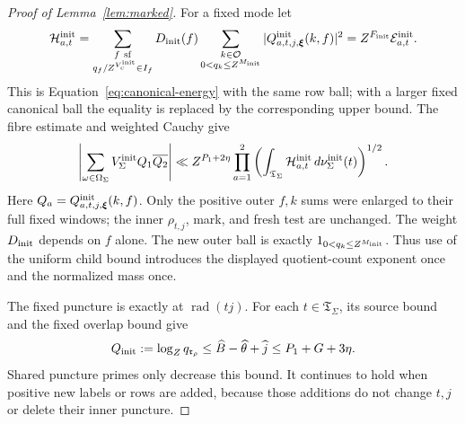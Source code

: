 \documentclass[11pt,a4paper]{article}
\numberwithin{equation}{section}
\numberwithin{figure}{section}
\theoremstyle{definition}
\theoremstyle{remark}
\begin{document}
\begin{proof}[Proof of Lemma~\ref{lem:marked}]
For a fixed mode let
\begin{equation}\label{eq:initial-positive-child}
 \mathcal H_{a,t}^{\rm init}
 =\sum_{\substack{f\ {\rm sf}\\q_f/Z^{V_c^{\rm init}}\in I_f}}
 D_{\rm init}(f)\sum_{\substack{k\in\mathcal O\\0<q_k\le Z^{M_{\rm init}}}}
 |Q^{\rm init}_{a,t,j,\boldsymbol\xi}(k,f)|^2
 =Z^{F_{\rm init}}\mathcal E_{a,t}^{\rm init}.
\end{equation}
This is Equation~\eqref{eq:canonical-energy} with the same row ball;
with a larger fixed canonical ball the equality is replaced by the
corresponding upper bound.  The fibre estimate and weighted Cauchy give
\begin{equation}\label{eq:initial-weighted-count}
 \left|\sum_{\omega\in\Omega_\Sigma}V_\Sigma^{\rm init}Q_1\overline{Q_2}\right|
 \ll Z^{P_1+2\eta}
 \prod_{a=1}^2
 \left(\int_{\mathfrak T_\Sigma}\mathcal H_{a,t}^{\rm init}
                         \,d\nu_\Sigma^{\rm init}(t)\right)^{1/2}.
\end{equation}
Here \(Q_a=Q^{\rm init}_{a,t,j,\boldsymbol\xi}(k,f)\).
Only the positive outer \(f,k\) sums were enlarged to their full
fixed windows; the inner \(\rho_{t,j}\), mark, and fresh test are
unchanged.  The weight \(D_{\rm init}\) depends on \(f\) alone.
The new outer ball is exactly \(1_{0<q_k\le Z^{M_{\rm init}}}\).
Thus use of the uniform child bound introduces the displayed quotient-count
exponent once and the normalized mass once.

The fixed puncture is exactly at \(\operatorname{rad}(tj)\).
For each \(t\in\mathfrak T_\Sigma\), its source bound and the
fixed overlap bound give
\begin{equation}\label{old-eq:4.13}
 Q_{\rm init}:=\log_Zq_{\mathfrak r_\rho}
 \le\widehat B-\widehat\theta+\widehat j\le P_1+G+3\eta.
\end{equation}
Shared puncture primes only decrease this bound.  It continues to hold
when positive new labels or rows are added, because those additions
do not change \(t,j\) or delete their inner puncture.


\end{proof}
\end{document}
